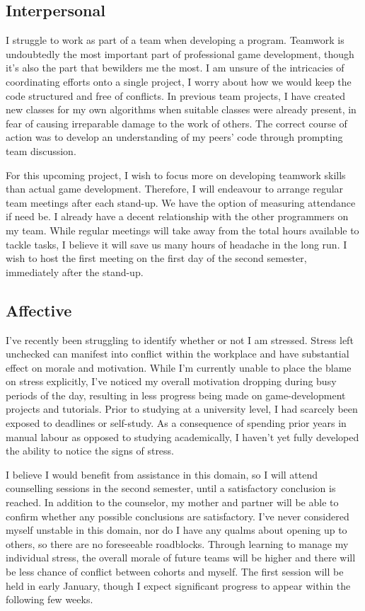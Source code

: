 \documentclass{article}
\begin{document}
\subsection{Interpersonal}

I struggle to work as part of a team when developing a program.
Teamwork is undoubtedly the most important part of professional game development, though it's also the part that bewilders me the most.
I am unsure of the intricacies of coordinating efforts onto a single project, I worry about how we would keep the code structured and free of conflicts.
In previous team projects, I have created new classes for my own algorithms when suitable classes were already present, in fear of causing irreparable damage to the work of others. The correct course of action was to develop an understanding of my peers' code through prompting team discussion.

For this upcoming project, I wish to focus more on developing teamwork skills than actual game development. Therefore, I will endeavour to arrange regular team meetings after each stand-up.
We have the option of measuring attendance if need be.
I already have a decent relationship with the other programmers on my team.
While regular meetings will take away from the total hours available to tackle tasks, I believe it will save us many hours of headache in the long run.
I wish to host the first meeting on the first day of the second semester, immediately after the stand-up.

\newpage

\subsection{Affective}

I've recently been struggling to identify whether or not I am stressed.
Stress left unchecked can manifest into conflict within the workplace and have substantial effect on morale and motivation.\cite{lazarus1995psychological}
While I'm currently unable to place the blame on stress explicitly, I've noticed my overall motivation dropping during busy periods of the day, resulting in less progress being made on game-development projects and tutorials.
Prior to studying at a university level, I had scarcely been exposed to deadlines or self-study. As a consequence of spending prior years in manual labour as opposed to studying academically, I haven't yet fully developed the ability to notice the signs of stress.

I believe I would benefit from assistance in this domain, so I will attend counselling sessions in the second semester, until a satisfactory conclusion is reached. 
In addition to the counselor, my mother and partner will be able to confirm whether any possible conclusions are satisfactory. 
I've never considered myself unstable in this domain, nor do I have any qualms about opening up to others, so there are no foreseeable roadblocks.
Through learning to manage my individual stress, the overall morale of future teams will be higher and there will be less chance of conflict between cohorts and myself.\cite{lazarus1995psychological}
The first session will be held in early January, though I expect significant progress to appear within the following few weeks.
\end{document}
